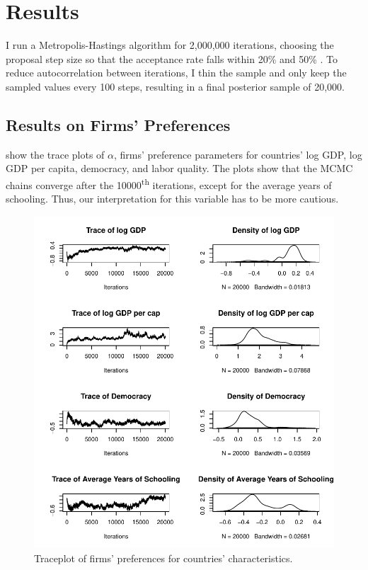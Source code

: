 \section{Results}
\label{sec:result}

I run a Metropolis-Hastings algorithm for 2,000,000 iterations, choosing the proposal step size so that the acceptance rate falls within 20\% and 50\% \citep{Hoff2009}. To reduce autocorrelation between iterations, I thin the sample and only keep the sampled values every 100 steps, resulting in a final posterior sample of 20,000.

\subsection{Results on Firms' Preferences}

 show the trace plots of $\alpha$, firms' preference parameters for countries' log GDP, log GDP per capita, democracy, and labor quality. The plots show that the MCMC chains converge after the 10000\textsuperscript{th} iterations, except for the average years of schooling. Thus, our interpretation for this variable has to be more cautious.

\begin{figure}[!ht]
\centering
\includegraphics[width=\textwidth,keepaspectratio]{../figure/traceplot_alpha}
\caption{Traceplot of firms' preferences for countries' characteristics.}
\label{fig:traceplot_alpha}
\end{figure}

